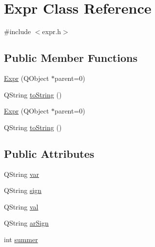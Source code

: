 \hypertarget{class_expr}{
\section{Expr Class Reference}
\label{class_expr}
}


{\ttfamily \#include $<$expr.h$>$}

\subsection*{Public Member Functions}
\begin{DoxyCompactItemize}
\item 
\hyperlink{class_expr_a242c619f63b26620cec5291a8437c7e9}{Expr} (QObject $\ast$parent=0)
\item 
QString \hyperlink{class_expr_aba1c5d0a00664b956ac65c5e3e2762c3}{toString} ()
\item 
\hyperlink{class_expr_a242c619f63b26620cec5291a8437c7e9}{Expr} (QObject $\ast$parent=0)
\item 
QString \hyperlink{class_expr_aba1c5d0a00664b956ac65c5e3e2762c3}{toString} ()
\end{DoxyCompactItemize}
\subsection*{Public Attributes}
\begin{DoxyCompactItemize}
\item 
QString \hyperlink{class_expr_ae3f93c6eca1ca9c9f250c11d8fef0abe}{var}
\item 
QString \hyperlink{class_expr_a92122d8f14e84486df0a55355d567f1f}{sign}
\item 
QString \hyperlink{class_expr_aaf68d9135f3f9146570e1bb56a2a0e09}{val}
\item 
QString \hyperlink{class_expr_a61eb93b6686f5905c3cfdd47c7fec997}{arSign}
\item 
int \hyperlink{class_expr_ac0a6b22ed02b1292a14332d2c03a534f}{summer}
\end{DoxyCompactItemize}


